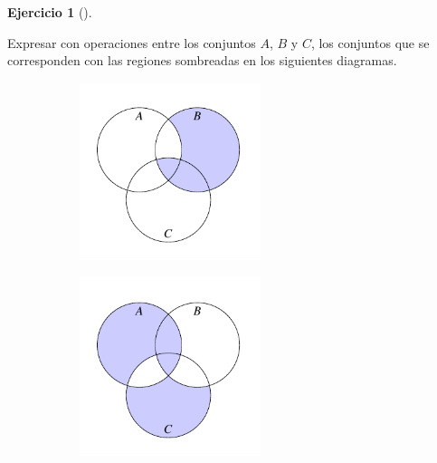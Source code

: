 \documentclass[
  a4paper,
]{scrreport}
\theoremstyle{definition}
\newtheorem{exercise}{Ejercicio}[chapter]
\theoremstyle{remark}
\begin{document}
\begin{exercise}[]\protect\hypertarget{exr-expresion-conjuntos}{}\label{exr-expresion-conjuntos}

Expresar con operaciones entre los conjuntos \(A\), \(B\) y \(C\), los
conjuntos que se corresponden con las regiones sombreadas en los
siguientes diagramas.

\begin{figure}

\begin{minipage}{0.33\linewidth}

\begin{figure}[H]

{\centering \includegraphics[width=2.08333in,height=\textheight,keepaspectratio]{./img/teoria-conjuntos/conjunto2.pdf}

}


\end{figure}%

\end{minipage}%
%
\begin{minipage}{0.33\linewidth}

\begin{figure}[H]

{\centering \includegraphics[width=2.08333in,height=\textheight,keepaspectratio]{./img/teoria-conjuntos/conjunto1.pdf}

}



\end{figure}
\end{minipage}
\end{figure}
\end{exercise}
\end{document}
